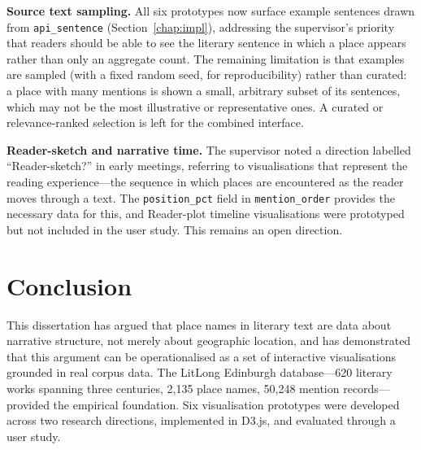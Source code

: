 \documentclass[logo,msc]{infthesis}
\begin{document}
\textbf{Source text sampling.} All six prototypes now surface example sentences drawn from \texttt{api\_sentence} (Section~\ref{chap:impl}), addressing the supervisor's priority that readers should be able to see the literary sentence in which a place appears rather than only an aggregate count. The remaining limitation is that examples are sampled (with a fixed random seed, for reproducibility) rather than curated: a place with many mentions is shown a small, arbitrary subset of its sentences, which may not be the most illustrative or representative ones. A curated or relevance-ranked selection is left for the combined interface.
 
\textbf{Reader-sketch and narrative time.} The supervisor noted a direction labelled ``Reader-sketch?'' in early meetings, referring to visualisations that represent the reading experience---the sequence in which places are encountered as the reader moves through a text. The \texttt{position\_pct} field in \texttt{mention\_order} provides the necessary data for this, and Reader-plot timeline visualisations were prototyped but not included in the user study. This remains an open direction.
 
 
\chapter{Conclusion}
\label{chap:conclusion}
 
This dissertation has argued that place names in literary text are data about narrative structure, not merely about geographic location, and has demonstrated that this argument can be operationalised as a set of interactive visualisations grounded in real corpus data. The LitLong Edinburgh database---620 literary works spanning three centuries, 2,135 place names, 50,248 mention records---provided the empirical foundation. Six visualisation prototypes were developed across two research directions, implemented in D3.js, and evaluated through a user study.
 
\end{document}
